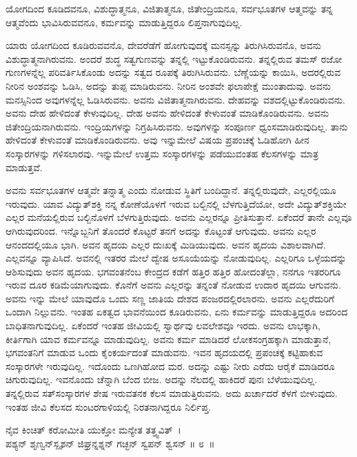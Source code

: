 ಯೋಗದಿಂದ ಕೂಡಿದವನೂ, ವಿಶುದ್ಧಾತ್ಮನೂ, ವಿಜಿತಾತ್ಮನೂ, ಜಿತೇಂದ್ರಿಯನೂ, ಸರ್ವ\-ಭೂತಗಳ ಆತ್ಮವನ್ನು ತನ್ನ ಆತ್ಮವೆಂದು ಭಾವಿಸಿರುವವನೂ, ಕರ್ಮವನ್ನು ಮಾಡುತ್ತಿದ್ದರೂ ಲಿಪ್ತ\-ನಾಗುವುದಿಲ್ಲ.

ಯಾರು ಯೋಗದಿಂದ ಕೂಡಿರುವವನೊ, ದೇವರೆಡೆಗೆ ಹೋಗುವುದಕ್ಕೆ ಮನಸ್ಸನ್ನು ತಿರುಗಿ\-ಸಿರುವನೊ, ಅವನು ವಿಶುದ್ಧಾತ್ಮನಾಗಿರುವನು. ಅಂದರೆ ಶುದ್ಧ ಸತ್ವಗುಣವನ್ನು ತನ್ನಲ್ಲಿ ಇಟ್ಟು\-ಕೊಂಡಿರುವನು. ತನ್ನಲ್ಲಿರುವ ತಮಸ್ ರಜೋ ಗುಣಗಳನ್ನೆಲ್ಲ ಪರಿವರ್ತಿಸಿಕೊಂಡು ಅದನ್ನು ಸತ್ವದ ರೂಪಕ್ಕೆ ತಿರುಗಿಸಿರುವನು. ಬೆಣ್ಣೆಯನ್ನು ಕಾಯಿಸಿ, ಅದರಲ್ಲಿರುವ ನೀರಿನ ಅಂಶವನ್ನು ಓಡಿಸಿ, ಅದನ್ನು ತುಪ್ಪ ಮಾಡಿರುವನು. ನೀರಿನ ಅಂಶವೇ ಫಲಾಪೇಕ್ಷೆ ಮುಂತಾದುವು. ಅವನು ಮನಸ್ಸಿನಿಂದ ಅವುಗಳನ್ನೆಲ್ಲ ಓಡಿಸಿರುವನು. ಅವನು ವಿಜಿತಾತ್ಮನಾಗಿರುವನು. ದೇಹವನ್ನು ವಶದಲ್ಲಿಟ್ಟುಕೊಂಡಿರುವನು. ಅವನು ದೇಹ ಹೇಳಿದಂತೆ ಕೇಳುವುದಿಲ್ಲ. ದೇಹ ಅವನು ಹೇಳಿದಂತೆ ಕೇಳುವಂತೆ ಮಾಡಿಕೊಂಡಿರುವನು. ಅವನು ಜಿತೇಂದ್ರಿಯನಾಗಿರುವನು. ಇಂದ್ರಿಯಗಳನ್ನು ನಿಗ್ರಹಿಸಿರುವನು. ಅವುಗಳನ್ನು ಸಂಪೂರ್ಣ ಧ್ವಂಸಮಾಡಿರುವುದಿಲ್ಲ. ತಾನು ಹೇಳಿದಂತೆ ಕೇಳುವಂತೆ ಮಾಡಿಕೊಂಡಿರುವನು. ಅವು ಇನ್ನುಮೇಲೆ ವಿಷಯ ಪ್ರಪಂಚಕ್ಕೆ ಓಡಿಹೋಗಿ ಹೀನ ಸಂಸ್ಕಾರಗಳನ್ನು ಗಳಿಸಲಾರವು. ಇನ್ನುಮೇಲೆ ಉತ್ತಮ ಸಂಸ್ಕಾರಗಳನ್ನು ಪಡೆಯುವಂತಹ ಕೆಲಸಗಳನ್ನು ಮಾತ್ರ ಮಾಡುತ್ತವೆ.

ಅವನು ಸರ್ವಭೂತಗಳ ಆತ್ಮವೇ ತನ್ನಾತ್ಮ ಎಂದು ನೋಡುವ ಸ್ಥಿತಿಗೆ ಬಂದಿದ್ದಾನೆ. ತನ್ನಲ್ಲಿರು\-ವುದೇ, ಎಲ್ಲರಲ್ಲಿಯೂ ಇರುವುದು. ಯಾವ ವಿದ್ಯುತ್​ಶಕ್ತಿ ನನ್ನ ಕೋಣೆಯೊಳಗೆ ಇರುವ ಬಲ್ಬಿನಲ್ಲಿ ಬೆಳಗುತ್ತಿದೆಯೋ, ಅದೇ ವಿದ್ಯುತ್​ಶಕ್ತಿಯೇ ಎಲ್ಲರ ಮನೆಯಲ್ಲಿರುವ ಬಲ್ಬಿನೊಳಗೆ ಬೆಳಗುತ್ತಿರುವುದು. ಅವನು ಎಲ್ಲರನ್ನೂ ಪ್ರೀತಿಸುತ್ತಾನೆ. ಏಕೆಂದರೆ ತಾನೇ ಎಲ್ಲವೂ ಆಗಿರುವುದರಿಂದ. ಇನ್ನೊಬ್ಬನಿಗೆ ತೊಂದರೆ ಕೊಟ್ಟರೆ ತನಗೆ ಅದನ್ನು ಕೊಟ್ಟಂತೆ ಆಗುವುದು. ಅವನು ಎಲ್ಲರ ಆನಂದದಲ್ಲಿಯೂ ಭಾಗಿ. ಅವನ ಹೃದಯ ಎಲ್ಲರ ದುಃಖಕ್ಕೆ ಮಿಡಿಯುವುದು. ಅವನ ಹೃದಯ ವಿಶಾಲವಾಗಿದೆ. ಎಲ್ಲವನ್ನೂ ವ್ಯಾಪಿಸಿದೆ. ಅವನಲ್ಲಿ ಇತರರ ಮೇಲೆ ದ್ವೇಷ ಅಸೂಯೆಯನ್ನು ನೋಡುವುದಿಲ್ಲ. ಎಲ್ಲರಿಗೂ ಒಳ್ಳೆಯದನ್ನು ಆಶಿಸುವುದು ಅವನ ಹೃದಯ. ಭಗವಂತನೆಂಬ ಕೇಂದ್ರದ ಕಡೆಗೆ ಹತ್ತಿರ ಹತ್ತಿರ ಹೋದಂತೆಲ್ಲಾ, ನನಗೂ ಇತರರಿಗೂ ಇರುವ ದೂರ ಕಡಿಮೆಯಾಗುವುದು. ಕೊನೆಗೆ ಅವನು ಎಲ್ಲರನ್ನು ತನ್ನಂತೆ ನೋಡುವ ಉದಾರ ಹೃದಯಿ ಆಗುವನು. ಅವನು ಇನ್ನು ಮೇಲೆ ಯಾವುದೊ ಒಂದು ಸಣ್ಣ ಜಾತಿಯ ದೇಶದ ಪಂಜರದಲ್ಲಿರಲಾರನು. ಅವನು ಎಲ್ಲರೆದುರಿಗೆ ಒಂದಾಗಿ ನಿಲ್ಲುವನು. ಇಂತಹ ಏಕತ್ವದ ಭಾವನೆಯಿಂದ ಕೂಡಿರುವನು, ಏನು ಕರ್ಮವನ್ನು ಮಾಡುತ್ತಿದ್ದರೂ ಅದರಿಂದ ಬಾಧಿತನಾಗುವುದಿಲ್ಲ. ಏಕೆಂದರೆ ಇಂತಹ ಜೀವಿಯಲ್ಲಿ ಸ್ವಾರ್ಥವು ಲವಲೇಶವೂ ಇರದು. ಅವನು ಲಾಭಕ್ಕಾಗಿ, ಕೀರ್ತಿಗಾಗಿ ಯಾವ ಕರ್ಮವನ್ನೂ ಮಾಡುವುದಿಲ್ಲ. ಅವನು ಕರ್ಮ ಮಾಡಿದರೆ ಲೋಕಸಂಗ್ರಹಕ್ಕಾಗಿ ಮಾಡುತ್ತಾನೆ, ಭಗವಂತನಿಗೆ ಮಾಡುವ ಒಂದು ಕೈಂಕರ್ಯದಂತೆ ಮಾಡುವನು. ಇವನ ಹೃದಯದಲ್ಲಿ ಪ್ರಪಂಚಕ್ಕೆ ಕಟ್ಟಿಹಾಕುವ ಸಂಸ್ಕಾರಗಳೇ ಇರುವುದಿಲ್ಲ. ಇದೊಂದು ಒಣಗಿಹೋದ ಮರ. ಅದನ್ನು ಎಷ್ಟು ನೀರು ಎರೆದು ಆರೈಕೆ ಮಾಡಿದರೂ ಚಿಗುರುವುದಿಲ್ಲ. ಇವನೊಂದು ಚೆನ್ನಾಗಿ ಬೆಂದ ಬೀಜ. ಅದನ್ನು ನೆಲದಲ್ಲಿ ಹಾಕಿದರೆ ಪುನಃ ಬೆಳೆಯುವುದಿಲ್ಲ. ತನ್ನಲ್ಲಿರುವ ಸತ್​ಸಂಸ್ಕಾರಗಳ ಶೇಷ ಇರುವತನಕ ಕೆಲಸ ಮಾಡುತ್ತಿರುವನು. ಅದು ಖರ್ಚಾದರೆ ಕೆಳಗೆ ಬೀಳುವುದು. ಇಂತಹ ಜೀವಿ ಕೆಲಸದ ಸುಂಟರಗಾಳಿಯಲ್ಲಿ ನಿರತನಾಗಿದ್ದರೂ ನಿರ್ಲಿಪ್ತ.

\begin{shloka}
ನೈವ ಕಿಂಚಿತ್ ಕರೋಮೀತಿ ಯುಕ್ತೋ ಮನ್ಯೇತ ತತ್ತ್ವವಿತ್~।\\ಪಶ್ಯನ್ ಶೃಣ್ವನ್​ಸ್ಪೃಶನ್ ಜಿಘ್ರನ್ನಶ್ನನ್ ಗಚ್ಛನ್ ಸ್ವಪನ್ ಶ್ವಸನ್ \hfill॥ ೮~॥
\end{shloka}

